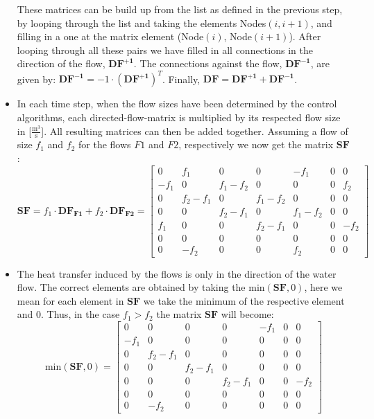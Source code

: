 \begin{itemize}
These matrices can be build up from the list as defined in the previous step, by looping through the list and taking the elements Nodes$(i,i+1)$, and filling in a one at the matrix element (Node$(i)$, Node$(i+1)$). After looping through all these pairs we have filled in all connections in the direction of the flow, $\mathbf{DF^{+1}}$. The connections against the flow, $\mathbf{DF^{-1}}$, are given by: $\mathbf{DF^{-1}} = -1 \cdot (\mathbf{DF^{+1}})^T$. Finally, $\mathbf{DF} = \mathbf{DF^{+1}} + \mathbf{DF^{-1}}$. 
\item In each time step, when the flow sizes have been determined by the control algorithms, each directed-flow-matrix is multiplied by its respected flow size in [$\frac{\text{m}^3}{\text{s}}$]. All resulting matrices can then be added together. Assuming a flow of size $f_1$ and $f_2$ for the flows $F1$ and $F2$, respectively we now get the matrix $\mathbf{SF}$:
\begin{equation}
		\mathbf{SF} = f_1 \cdot \mathbf{DF_{F1}} + f_2 \cdot \mathbf{DF_{F2}} = \begin{bmatrix}
							0   & f_1    & 0       & 0       & -f_1    & 0 & 0 \\
							-f_1& 0      & f_1-f_2 & 0       & 0       & 0 & f_2 \\
							0   & f_2-f_1& 0       & f_1-f_2 & 0       & 0 & 0 \\
							0   & 0      & f_2-f_1 & 0       & f_1-f_2 & 0 & 0 \\
							f_1 & 0      & 0       & f_2-f_1 & 0       & 0 & -f_2 \\
							0   & 0      & 0       & 0       & 0       & 0 & 0 \\
							0   & -f_2   & 0       & 0       & f_2     & 0 & 0 
							\end{bmatrix}
	\label{eq:addflows}
	\end{equation}
\item The heat transfer induced by the flows is only in the direction of the water flow. The correct elements are obtained by taking the $\text{min}(\mathbf{SF},0)$, here we mean for each element in $\mathbf{SF}$ we take the minimum of the respective element and 0. Thus, in the case $f_1>f_2$ the matrix $\mathbf{SF}$ will become:
\begin{equation}
		\text{min}(\mathbf{SF},0) =  \begin{bmatrix}
							0   & 0      & 0       & 0       & -f_1    & 0 & 0 \\
							-f_1& 0      & 0		   & 0       & 0       & 0 & 0 \\
							0   & f_2-f_1& 0       & 0			 & 0       & 0 & 0 \\
							0   & 0      & f_2-f_1 & 0       & 0			 & 0 & 0 \\
							0	  & 0      & 0       & f_2-f_1 & 0       & 0 & -f_2 \\
							0   & 0      & 0       & 0       & 0       & 0 & 0 \\
							0   & -f_2   & 0       & 0       & 0       & 0 & 0 
							\end{bmatrix}
	\label{eq:minSFzero}
	\end{equation}




\end{itemize}
